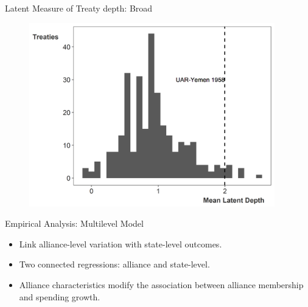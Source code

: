 \documentclass[12pt]{beamer}
\begin{document}

\begin{frame}{Latent Measure of Treaty depth: Broad}

\begin{figure}[htbp]
	\centering
		\includegraphics[width=0.95\textwidth]{ld-hist-deep.png}
\end{figure}


\end{frame} 



\begin{frame}{Empirical Analysis: Multilevel Model}

\begin{itemize} 
\item Link alliance-level variation with state-level outcomes. 
\pause
\item Two connected regressions: alliance and state-level. 
\pause 
\item Alliance characteristics modify the association between alliance membership and spending growth.  
\end{itemize} 

\end{frame} 


\end{document}
